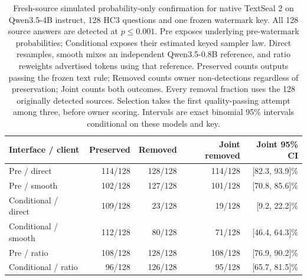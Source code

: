\begin{table}[ht]\centering\small
\begin{tabular}{lrrrr}\toprule
Interface / client & Preserved & Removed & Joint removed & Joint 95\% CI\\\midrule
Pre / direct & 114/128 & 128/128 & 114/128 & [82.3, 93.9]\%\\
Pre / smooth & 102/128 & 127/128 & 101/128 & [70.8, 85.6]\%\\
Conditional / direct & 109/128 & 23/128 & 19/128 & [9.2, 22.2]\%\\
Conditional / smooth & 112/128 & 80/128 & 71/128 & [46.4, 64.3]\%\\
Pre / ratio & 108/128 & 128/128 & 108/128 & [76.9, 90.2]\%\\
Conditional / ratio & 96/128 & 126/128 & 95/128 & [65.7, 81.5]\%\\
\bottomrule\end{tabular}
\caption{Fresh-source simulated probability-only confirmation for native TextSeal 2 on Qwen3.5-4B instruct, 128 HC3 questions and one frozen watermark key. All 128 source answers are detected at $p\leq0.001$. Pre exposes underlying pre-watermark probabilities; Conditional exposes their estimated keyed sampler law. Direct resamples, smooth mixes an independent Qwen3.5-0.8B reference, and ratio reweights advertised tokens using that reference. Preserved counts outputs passing the frozen text rule; Removed counts owner non-detections regardless of preservation; Joint counts both outcomes. Every removal fraction uses the 128 originally detected sources. Selection takes the first quality-passing attempt among three, before owner scoring. Intervals are exact binomial 95\% intervals conditional on these models and key.}\end{table}
